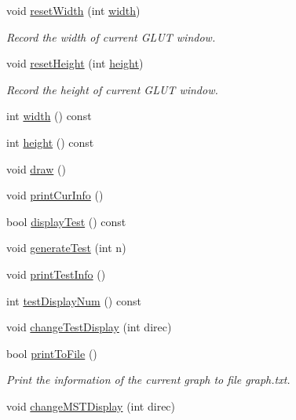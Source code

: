 \begin{DoxyCompactItemize}
void \hyperlink{classcmst_1_1_window_a3f234daf3198e3611892515f1721de44}{reset\+Width} (int \hyperlink{classcmst_1_1_window_a5fc4ccbd9afed56cd17d341269028da2}{width})
\begin{DoxyCompactList}\small\item\em Record the width of current G\+L\+UT window. \end{DoxyCompactList}\item 
void \hyperlink{classcmst_1_1_window_a8c4d7788d1932e73397c20b7a9639d69}{reset\+Height} (int \hyperlink{classcmst_1_1_window_a6fc02b2afee52c0f71b6a3bd39c9210f}{height})
\begin{DoxyCompactList}\small\item\em Record the height of current G\+L\+UT window. \end{DoxyCompactList}\item 
int \hyperlink{classcmst_1_1_window_a5fc4ccbd9afed56cd17d341269028da2}{width} () const 
\item 
int \hyperlink{classcmst_1_1_window_a6fc02b2afee52c0f71b6a3bd39c9210f}{height} () const 
\item 
void \hyperlink{classcmst_1_1_window_a1d78ef796691e87ed3b4978f373c9890}{draw} ()
\item 
void \hyperlink{classcmst_1_1_window_a73eb23d7d7418cb288022e623e590461}{print\+Cur\+Info} ()
\item 
bool \hyperlink{classcmst_1_1_window_aa3f5edeebdd298190bdb4676b4838f75}{display\+Test} () const 
\item 
void \hyperlink{classcmst_1_1_window_acda99115d9c67f83de4d8f5a94f2647c}{generate\+Test} (int n)
\item 
void \hyperlink{classcmst_1_1_window_a471e1648f99754f7c2cbfbbb1e8ab556}{print\+Test\+Info} ()
\item 
int \hyperlink{classcmst_1_1_window_ae456c1bf45fc28133390fcc881fbd612}{test\+Display\+Num} () const 
\item 
void \hyperlink{classcmst_1_1_window_aa8dc3725888e12fc2c6e3626ab7b600a}{change\+Test\+Display} (int direc)
\item 
bool \hyperlink{classcmst_1_1_window_a1d2514395cd8e864ddcd6aadf127bbbc}{print\+To\+File} ()
\begin{DoxyCompactList}\small\item\em Print the information of the current graph to file graph.\+txt. \end{DoxyCompactList}\item 
void \hyperlink{classcmst_1_1_window_ae9d9bf19cad20b34a6ab850a8a218c13}{change\+M\+S\+T\+Display} (int direc)

\end{DoxyCompactItemize}
